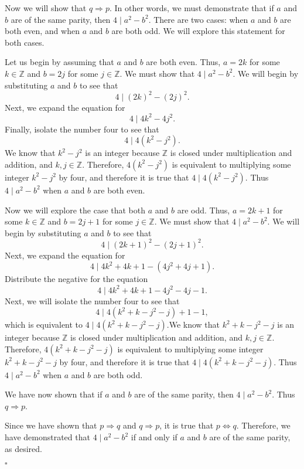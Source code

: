 \documentclass[12pt]{exam}
\begin{document}
\begin{questions}
Now we will show that $q \Rightarrow p$. In other words, we must demonstrate that if $a$ and $b$ are of the same parity, then $4 \mid a^2-b^2$. There are two cases: when $a$ and $b$ are both even, and when $a$ and $b$ are both odd. We will explore this statement for both cases.
\par
Let us begin by assuming that $a$ and $b$ are both even. Thus, $a=2k$ for some $k \in \mathbb{Z}$ and $b=2j$ for some $j \in \mathbb{Z}$. We must show that $4 \mid a^2-b^2$. We will begin by substituting $a$ and $b$ to see that 
\begin{equation*}
4 \mid (2k)^2-(2j)^2.
\end{equation*}
Next, we expand the equation for
\begin{equation*}
4 \mid 4k^2-4j^2.
\end{equation*}
Finally, isolate the number four to see that
\begin{equation*}
4 \mid 4(k^2-j^2).
\end{equation*}
We know that $k^2-j^2$ is an integer because $\mathbb{Z}$ is closed under multiplication and addition, and $k,j \in\mathbb{Z}$. Therefore, $4(k^2-j^2)$ is equivalent to multiplying some integer $k^2-j^2$ by four, and therefore it is true that $4 \mid 4(k^2-j^2)$. Thus $4 \mid a^2-b^2$ when $a$ and $b$ are both even.
\par
Now we will explore the case that both $a$ and $b$ are odd. Thus, $a=2k+1$ for some $k \in \mathbb{Z}$ and $b=2j+1$ for some $j \in \mathbb{Z}$. We must show that $4 \mid a^2-b^2$. We will begin by substituting $a$ and $b$ to see that
\begin{equation*}
4 \mid (2k+1)^2-(2j+1)^2.
\end{equation*}
Next, we expand the equation for
\begin{equation*}
4 \mid 4k^2+4k+1-(4j^2+4j+1).
\end{equation*}
Distribute the negative for the equation
\begin{equation*}
4 \mid 4k^2+4k+1-4j^2-4j-1.
\end{equation*}
Next, we will isolate the number four to see that
\begin{equation*}
4 \mid 4(k^2+k-j^2-j)+1-1,
\end{equation*}
which is equivalent to $4 \mid 4(k^2+k-j^2-j)$.We know that $k^2+k-j^2-j$ is an integer because $\mathbb{Z}$ is closed under multiplication and addition, and $k,j \in\mathbb{Z}$. Therefore, $4(k^2+k-j^2-j)$ is equivalent to multiplying some integer $k^2+k-j^2-j$ by four, and therefore it is true that $4 \mid 4(k^2+k-j^2-j)$. Thus $4 \mid a^2-b^2$ when $a$ and $b$ are both odd.
\par
We have now shown that if $a$ and $b$ are of the same parity, then $4 \mid a^2-b^2$. Thus $q \Rightarrow p$.
\par
Since we have shown that $p \Rightarrow q$ and $q \Rightarrow p$, it is true that $p \Leftrightarrow q$. Therefore, we have demonstrated that $4 \mid a^2-b^2$ if and only if $a$ and $b$ are of the same parity, as desired.
\begin{flushright}
$\square$
\end{flushright}


\end{questions}
\end{document}
